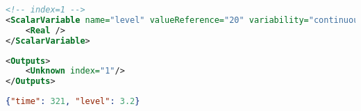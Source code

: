 \begin{lstlisting}[label={lst:fmi-outputs-config},caption={FMI Outputs scalar
    variable configuration of RabbitMQ FMU},language=XML]
<!-- index=1 -->
<ScalarVariable name="level" valueReference="20" variability="continuous" causality="output">
    <Real />
</ScalarVariable>
\end{lstlisting}
\begin{lstlisting}[label={lst:fmi-outputs-config2},caption={FMI Outputs index
    configuration of RabbitMQ FMU },language=XML]
<Outputs>
    <Unknown index="1"/>
</Outputs>
\end{lstlisting}

\begin{lstlisting}[label={lst:message-example},caption={Example of a JSON message.},language=JSON]
{"time": 321, "level": 3.2}
  \end{lstlisting}



